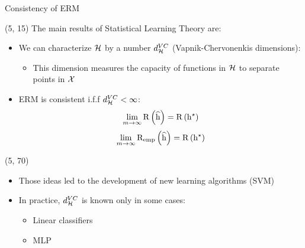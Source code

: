 \begin{frame}{Consistency of \acs{ERM}}

  \begin{textblock}{90}(5, 15)
    The main results of Statistical Learning Theory are:
    \begin{itemize}
    \item<1-> We can characterize $\mathcal{H}$ by a number $d^{VC}_{\mathcal{H}}$
      (Vapnik-Chervonenkis dimensions):
      \begin{itemize}
      \item This dimension measures the capacity of functions in $\mathcal{H}$ to
        separate points in $\mathcal{X}$
      \end{itemize}
    \item<2-> \ac{ERM} is consistent i.f.f $d^{VC}_{\mathcal{H}} < \infty$:
      \[
        \lim\limits_{m \to \infty} \mathrm{R} \left ( {\widehat{\mathrm{h}}} \right ) = \mathrm{R} \left ( {\mathrm{h}^{\star}} \right )
      \]
      \[
        \lim\limits_{m \to \infty} \mathrm{R_{emp}} \left ( {\widehat{\mathrm{h}}} \right ) = \mathrm{R} \left ( {\mathrm{h}^{\star}} \right )
      \]
    \end{itemize}
  \end{textblock}

  \begin{textblock}{90}(5, 70)
    \begin{itemize}
    \item<3-> Those ideas led to the development of new learning algorithms (SVM)
    \item<4-> In practice, $d^{VC}_{\mathcal{H}}$ is known only in some cases:
      \begin{itemize}
      \item Linear classifiers
      \item \ac{MLP}
      \end{itemize}
    \end{itemize}
  \end{textblock}
\end{frame}


